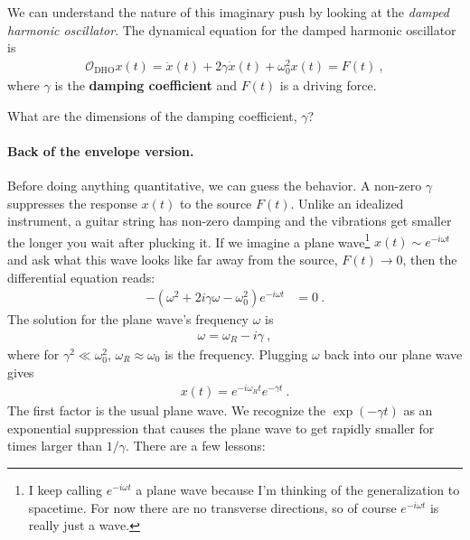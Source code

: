  We can understand the nature of this imaginary push by looking at the \emph{damped harmonic oscillator}. The dynamical equation for the damped harmonic oscillator is
 \begin{align}
 	\mathcal O_\text{DHO} x(t) = \ddot{x}(t) + 2\gamma\dot x(t) + \omega_0^2 x(t) = F(t) \ ,
 \end{align}
 where $\gamma$ is the \textbf{damping coefficient} and $F(t)$ is a driving force.
 \begin{exercise}
 What are the dimensions of the damping coefficient, $\gamma$?
 \end{exercise}
 
 \paragraph{Back of the envelope version.}
 Before doing anything quantitative, we can guess the behavior. A non-zero $\gamma$ suppresses the response $x(t)$ to the source $F(t)$. Unlike an idealized instrument, a guitar string has non-zero damping and the vibrations get smaller the longer you wait after plucking it. If we imagine a plane wave\footnote{I keep calling $e^{-i\omega t}$ a plane wave because I'm thinking of the generalization to spacetime. For now there are no transverse directions, so of course $e^{-i\omega t}$ is really just a wave.} $x(t)\sim e^{-i\omega t}$ and ask what this wave looks like far away from the source, $F(t)\to 0$, then the differential equation reads:
 \begin{align}
 	-\left(\omega^2 +2i\gamma \omega - \omega_0^2\right)e^{-i\omega t} &= 0 \ .
 \end{align}
 The solution for the plane wave's frequency $\omega$ is
 \begin{align}
 	\omega = \omega_R - i\gamma \ , \label{eq:DHO:back:envelope:poles}
 \end{align}
 where for $\gamma^2 \ll \omega_0^2$, $\omega_R \approx \omega_0$ is the frequency.  Plugging $\omega$ back into our plane wave gives
 \begin{align}
 	x(t) = e^{-i\omega_R t}e^{-\gamma t} \ .
 \end{align}
 The first factor is the usual plane wave. We recognize the $\exp(-\gamma t)$ as an exponential suppression that causes the plane wave to get rapidly smaller for times larger than $1/\gamma$. There are a few lessons:
